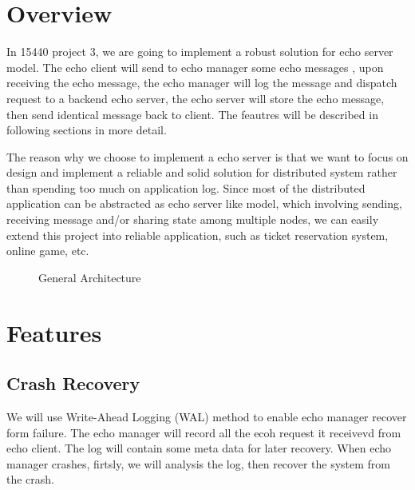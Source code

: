 \documentclass[12pt]{article}
\begin{document}
\pagestyle{headings}
\setcounter{page}{1}

\section{Overview}
In 15440 project 3, we are going to implement a robust solution for
echo server model. The echo client will send to echo manager some echo messages
, upon receiving the echo message, the echo manager will log the message and 
dispatch request to a backend echo server, the echo server will store the echo message, then send identical message back to client. The feautres will be described in following sections in more detail. 

The reason why we choose to implement a echo server is that
we want to focus on design and implement a reliable and solid solution
for distributed system rather than spending too much on application log. 
Since most of the distributed
application can be abstracted as echo server like model, which involving
sending, receiving message and/or sharing state among multiple nodes, we 
can easily extend this project into reliable application, such as 
ticket reservation system, online game, etc.

\begin{figure}[H] %
\caption{General Architecture}
\label{fig:speciation}
\end{figure}

\section{Features}
\subsection{Crash Recovery}
We will use Write-Ahead Logging (WAL) method to enable echo manager recover form
failure. The echo manager will record all the ecoh request it receivevd from echo 
client. The log will contain some meta data for later recovery. When echo manager 
crashes, firtsly, we will analysis the log, then recover the system from the crash. 
\end{document}
